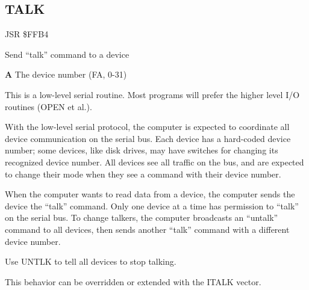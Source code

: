
\newpage
\subsection{TALK}
\label{KERNAL Jump Table!TALK}
\begin{description}[leftmargin=2cm,style=nextline]
    \item [Address:] JSR \$FFB4
    \item [Description:] Send ``talk'' command to a device
    \item [Inputs:]
        \textbf{A} The device number (FA, 0-31)
    \item [Remarks:]
        This is a low-level serial routine. Most programs will prefer the higher level I/O routines (OPEN et al.).

        With the low-level serial protocol, the computer is expected to coordinate all device communication on the serial bus. Each device has a hard-coded device number; some devices, like disk drives, may have switches for changing its recognized device number. All devices see all traffic on the bus, and are expected to change their mode when they see a command with their device number.

        When the computer wants to read data from a device, the computer sends the device the ``talk'' command. Only one device at a time has permission to ``talk'' on the serial bus. To change talkers, the computer broadcasts an ``untalk'' command to all devices, then sends another ``talk'' command with a different device number.

        Use UNTLK to tell all devices to stop talking.

        This behavior can be overridden or extended with the ITALK vector.
    \item [Example:]
\end{description}



\newpage
